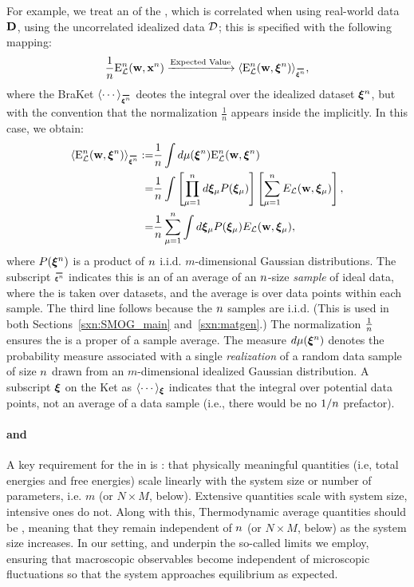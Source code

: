 For example, we treat an \ExpectedValue of the \DataSampleError , which is correlated when using real-world data $\mathbf{D}$, using the uncorrelated idealized data $\mathcal{D}$; this is specified with the following mapping:
\begin{align}
  \label{eqn:Emap}
  \frac{1}{\ND}\DETOPX \xrightarrow{\text{Expected Value}} \langle \DETOPXI \rangle_{\AVGNDXIn}  , %
\end{align}
where the BraKet $\langle\cdots\rangle_{\AVGNDXIn}$ deotes the integral over the idealized dataset $\boldsymbol{\xi}^{n}$, but with the convention that the normalization $\tfrac{1}{n}$
appears inside the \BraKet implicitly.
In this case, we obtain:
\begin{align}
  \langle \DETOPXI\rangle_{\AVGNDXIn}
  :=  &\frac{1}{\ND}\int d\mu(\NDXIn) \DETOPXI \nonumber \\
  = &
  \frac{1}{\ND}\int \left[ \prod_{\mu=1}^{\ND}d\XI_{\mu}P(\XI_{\mu})\right] \left[ \sum_{\mu=1}^{\ND}\DETmu \right] , \nonumber \\
  = &
  \frac{1}{\ND}\sum_{\mu=1}^{\ND}\int d\XI_{\mu}P(\XI_{\mu})\DETmu  , 
    \label{eqn:avg_data_sample_error}
\end{align}
where $P(\boldsymbol{\xi}^{n})$ is a product of $n$ i.i.d. $m$-dimensional Gaussian distributions.
The subscript $\AVGNDXIn$ indicates this is an
\ExpectedValue of an average of an $n$-size \emph{sample} of ideal data, where the \ExpectedValue is taken over datasets, and the average is over data points within each sample. The third line follows because the $n$ samples are i.i.d.
(This is used in both Sections~\ref{sxn:SMOG_main} and~\ref{sxn:matgen}.)
The normalization $\tfrac{1}{n}$ ensures the \BraKet is a proper \ExpectedValue of a sample average.
The measure $d\mu(\boldsymbol{\xi}^{n})$ 
denotes the probability measure associated with a single 
\emph{realization} of a random data sample of size $n$ drawn from an $m$-dimensional idealized Gaussian distribution.
A subscript $\boldsymbol{\xi}$ on the Ket as $\langle\cdots\rangle_{\boldsymbol{\xi}}$ indicates that the integral over potential data points, not an average of a data sample (i.e., there would be no $1/n$ prefactor).


\paragraph{\SizeExtensivity and \SizeIntensivity}
A key requirement for the \ThermodynamicLimit in \STATMECH is \emph{\SizeExtensivity}:
that physically meaningful quantities (i.e, total energies and free energies)
scale linearly with the system size or number of parameters, i.e. $m$ (or $N\times M$, below).
Extensive quantities scale with system size, intensive ones do not.
Along with this, Thermodynamic average quantities should be \emph{\SizeIntensive},
meaning that they remain independent of $n$ (or $N\times M$, below) as the system size increases.
In our setting, \SizeExtensivity and \SizeIntensivity underpin the so-called \LargeN limits we employ,
ensuring that macroscopic observables become independent of
microscopic fluctuations so that the system approaches equilibrium as expected.

